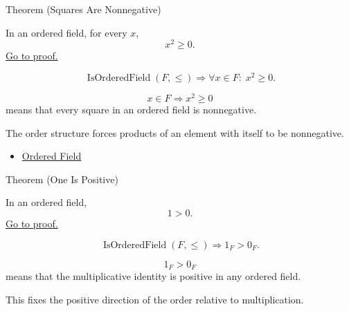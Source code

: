 \begin{theorembox}{Theorem (Squares Are Nonnegative)}
\begin{theorem}\label{thm:ordered-field-squares-nonnegative}
In an ordered field, for every $x$,
\[
x^2\ge 0.
\]
\hyperref[prf:ordered-field-squares-nonnegative]{Go to proof.}
\end{theorem}
\end{theorembox}

\begin{remark*}
\[
\operatorname{IsOrderedField}(F,\leq)
\Longrightarrow
\forall x\in F{:}\; x^2\geq 0.
\]
\end{remark*}

\begin{remark*}
\[
x\in F
\Longrightarrow
x^2\geq 0
\]
means that every square in an ordered field is nonnegative.
\end{remark*}

\begin{remark*}[Interpretation]
The order structure forces products of an element with itself to be
nonnegative.
\end{remark*}

\begin{dependencies}
\begin{itemize}
  \item \hyperref[def:ordered-field]{Ordered Field}
\end{itemize}
\end{dependencies}

\begin{theorembox}{Theorem (One Is Positive)}
\begin{theorem}\label{thm:ordered-field-one-positive}
In an ordered field,
\[
1>0.
\]
\hyperref[prf:ordered-field-one-positive]{Go to proof.}
\end{theorem}
\end{theorembox}

\begin{remark*}
\[
\operatorname{IsOrderedField}(F,\leq)
\Longrightarrow
1_F>0_F.
\]
\end{remark*}

\begin{remark*}
\[
1_F>0_F
\]
means that the multiplicative identity is positive in any ordered field.
\end{remark*}

\begin{remark*}[Interpretation]
This fixes the positive direction of the order relative to multiplication.
\end{remark*}

